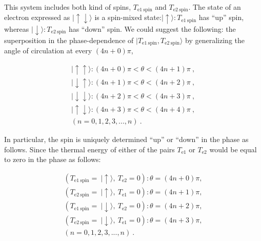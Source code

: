 \documentclass[%
 reprint,
 amsmath,amssymb,
 aps,
]{revtex4-1}
\numberwithin{equation}{section}
\begin{document}
    This system includes both kind of spins, $T_{\mathrm{e1 \ spin}}$ and $T_{\mathrm{e2 \ spin}}$. The state of an electron expressed as $\mid \uparrow \downarrow \rangle$ is a spin-mixed state:$\mid \uparrow \rangle : T_{\mathrm{e1 \ spin}}$ has ``up'' spin, whereas $\mid \downarrow \rangle : T_{\mathrm{e2 \ spin}}$ has ``down'' spin. We could suggest the following: the superposition in the phase-dependence of $\mid T_{\mathrm{e1 \ spin}}, T_{\mathrm{e2 \ spin}} \rangle$ by generalizing the angle of circulation at every $(4n+0)\pi$,

        \begin{equation}
            \begin{split}
                \mid \uparrow  \uparrow \rangle : (4n+0) \pi < \theta < (4n+1)\pi \ , \\
                \mid \downarrow \uparrow \rangle : (4n+1)\pi < \theta < (4n+2)\pi \ , \\
                \mid \downarrow \downarrow \rangle : (4n+2)\pi < \theta < (4n+3)\pi \ , \\
                \mid \uparrow \downarrow \rangle : (4n+3)\pi < \theta < (4n+4)\pi \ , \\
                (n=0,1,2,3,...,n)
                \ .
            \end{split}
            \label{e3_spin_Te1_Te2}
        \end{equation}

    In particular, the spin is uniquely determined ``up'' or ``down'' in the phase as follows. Since the thermal energy of either of the pairs $T_{\mathrm{e1}}$ or $T_{\mathrm{e2}}$ would be equal to zero in the phase as follows:

        \begin{equation}
            \begin{split}
                (T_{\mathrm{e1 \ spin}} = \ \mid \uparrow  \rangle , \ T_{\mathrm{e2}} = 0) : \theta = (4n+0) \pi , \\
                (T_{\mathrm{e2 \ spin}} = \ \mid \uparrow  \rangle, \ T_{\mathrm{e1}} = 0)  : \theta = (4n+1) \pi , \\
                (T_{\mathrm{e1 \ spin}} = \ \mid \downarrow  \rangle , \ T_{\mathrm{e2}} = 0) : \theta = (4n+2) \pi , \\
                (T_{\mathrm{e2 \ spin}} = \ \mid \downarrow  \rangle, \ T_{\mathrm{e1}} = 0)  : \theta = (4n+3) \pi , \\
                (n=0,1,2,3,...,n)
                \ .
            \end{split}
            \label{e3_spin_Te1_Te2_fixed}
        \end{equation}
\end{document}
